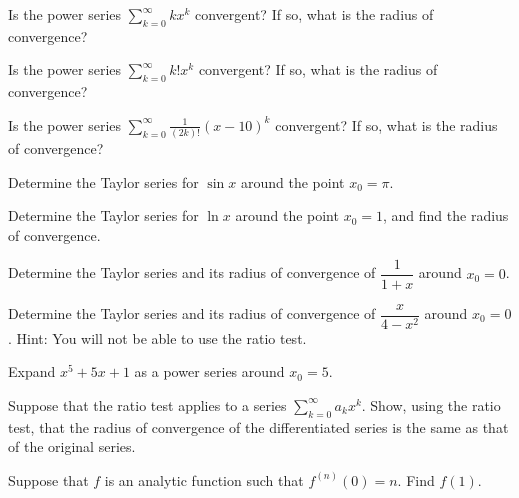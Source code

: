 \begin{exercise}
Is the power series $\displaystyle \sum_{k=0}^\infty k x^k$ convergent?
If so, what is the radius of convergence?
\end{exercise}

\begin{exercise}
Is the power series $\displaystyle \sum_{k=0}^\infty k! x^k$ convergent?
If so, what is the radius of convergence?
\end{exercise}

\begin{exercise}
Is the power series $\displaystyle \sum_{k=0}^\infty \frac{1}{(2k)!} {(x-10)}^k$
convergent?  If so, what is the radius of convergence?
\end{exercise}

\begin{exercise}
Determine the Taylor series for $\sin x$ around the point $x_0 = \pi$.
\end{exercise}

\begin{exercise}
Determine the Taylor series for $\ln x$ around the point $x_0 = 1$,
and find the radius of convergence.
\end{exercise}

\begin{exercise}
Determine the Taylor series
and its radius of convergence of $\dfrac{1}{1+x}$
around $x_0 = 0$.
\end{exercise}

\begin{exercise}
Determine the Taylor series and its radius of convergence
of
$\dfrac{x}{4-x^2}$ around $x_0 = 0$.  Hint: You will not be able to
use the ratio test.
\end{exercise}

\begin{exercise}
Expand $x^5+5x+1$ as a power series around $x_0 = 5$.
\end{exercise}

\begin{exercise}
Suppose that the ratio test applies to a series
$\displaystyle \sum_{k=0}^\infty a_k x^k$.  Show, using the ratio
test, that the radius of convergence of the differentiated
series is the same as that of the original series.
\end{exercise}

\begin{exercise}
Suppose that $f$ is an analytic function such that
$f^{(n)}(0) = n$.  Find $f(1)$.
\end{exercise}

